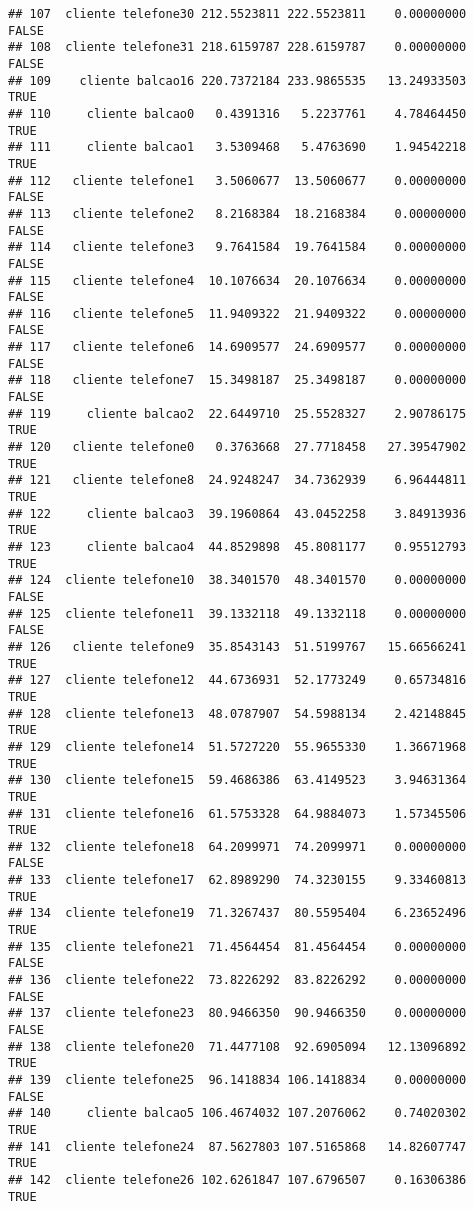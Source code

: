 \documentclass[
]{article}
\begin{document}
\begin{verbatim}
## 107  cliente telefone30 212.5523811 222.5523811    0.00000000    FALSE
## 108  cliente telefone31 218.6159787 228.6159787    0.00000000    FALSE
## 109    cliente balcao16 220.7372184 233.9865535   13.24933503     TRUE
## 110     cliente balcao0   0.4391316   5.2237761    4.78464450     TRUE
## 111     cliente balcao1   3.5309468   5.4763690    1.94542218     TRUE
## 112   cliente telefone1   3.5060677  13.5060677    0.00000000    FALSE
## 113   cliente telefone2   8.2168384  18.2168384    0.00000000    FALSE
## 114   cliente telefone3   9.7641584  19.7641584    0.00000000    FALSE
## 115   cliente telefone4  10.1076634  20.1076634    0.00000000    FALSE
## 116   cliente telefone5  11.9409322  21.9409322    0.00000000    FALSE
## 117   cliente telefone6  14.6909577  24.6909577    0.00000000    FALSE
## 118   cliente telefone7  15.3498187  25.3498187    0.00000000    FALSE
## 119     cliente balcao2  22.6449710  25.5528327    2.90786175     TRUE
## 120   cliente telefone0   0.3763668  27.7718458   27.39547902     TRUE
## 121   cliente telefone8  24.9248247  34.7362939    6.96444811     TRUE
## 122     cliente balcao3  39.1960864  43.0452258    3.84913936     TRUE
## 123     cliente balcao4  44.8529898  45.8081177    0.95512793     TRUE
## 124  cliente telefone10  38.3401570  48.3401570    0.00000000    FALSE
## 125  cliente telefone11  39.1332118  49.1332118    0.00000000    FALSE
## 126   cliente telefone9  35.8543143  51.5199767   15.66566241     TRUE
## 127  cliente telefone12  44.6736931  52.1773249    0.65734816     TRUE
## 128  cliente telefone13  48.0787907  54.5988134    2.42148845     TRUE
## 129  cliente telefone14  51.5727220  55.9655330    1.36671968     TRUE
## 130  cliente telefone15  59.4686386  63.4149523    3.94631364     TRUE
## 131  cliente telefone16  61.5753328  64.9884073    1.57345506     TRUE
## 132  cliente telefone18  64.2099971  74.2099971    0.00000000    FALSE
## 133  cliente telefone17  62.8989290  74.3230155    9.33460813     TRUE
## 134  cliente telefone19  71.3267437  80.5595404    6.23652496     TRUE
## 135  cliente telefone21  71.4564454  81.4564454    0.00000000    FALSE
## 136  cliente telefone22  73.8226292  83.8226292    0.00000000    FALSE
## 137  cliente telefone23  80.9466350  90.9466350    0.00000000    FALSE
## 138  cliente telefone20  71.4477108  92.6905094   12.13096892     TRUE
## 139  cliente telefone25  96.1418834 106.1418834    0.00000000    FALSE
## 140     cliente balcao5 106.4674032 107.2076062    0.74020302     TRUE
## 141  cliente telefone24  87.5627803 107.5165868   14.82607747     TRUE
## 142  cliente telefone26 102.6261847 107.6796507    0.16306386     TRUE

\end{verbatim}
\end{document}
